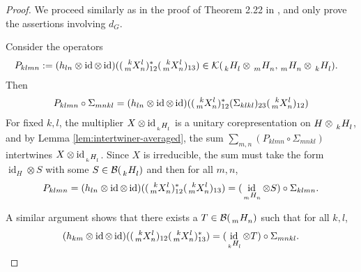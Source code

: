 \documentclass[11pt]{article}
\DeclareMathOperator{\id}{id}
\newcommand{\Gr}[5]{\,\tensor*[^{#2}_{#4}]{#1}{^{#3}_{#5}}}%
\newcommand{\Grd}[3]{\Gr{#1}{}{}{#2}{#3}}
\theoremstyle{definition}
\numberwithin{equation}{section}
\begin{document}
\begin{proof}
  We proceed similarly as in the proof of  Theorem 2.22 in \cite{}, and only prove the assertions
  involving $d_{G}$.

  Consider the operators
  \begin{align*}
    P_{klmn} &:= (h_{ln} \otimes \id \otimes
    \id)((\Gr{X}{k}{l}{m}{n})^{*}_{12}(\Gr{X}{k}{l}{m}{n})_{13})  \in
    \mathcal{K}(\Grd{H}{k}{l} \otimes \Grd{H}{m}{n}, \Grd{H}{m}{n}\otimes \Grd{H}{k}{l}).
  \end{align*}
  Then
  \begin{align*}
    P_{klmn} \circ \Sigma_{mnkl} = (h_{ln} \otimes \id \otimes \id)((\Gr{X}{k}{l}{m}{n})^{*}_{12}(\Sigma_{klkl})_{23}(\Gr{X}{k}{l}{m}{n})_{12})
  \end{align*}
  For fixed $k,l$, the multiplier $X \otimes \id_{\Grd{H}{k}{l}}$ is a unitary corepresentation on
  $H \otimes \Grd{H}{k}{l}$, and by Lemma \ref{lem:intertwiner-averaged}, the sum $\sum_{m,n}
  (P_{klmn}\circ \Sigma_{mnkl})$ intertwines $X \otimes \id_{\Grd{H}{k}{l}}$. Since $X$ is
  irreducible, the sum must take the form $\id_{H} \otimes S$ with some $S\in
  \mathcal{B}(\Grd{H}{k}{l})$ and then for all $m,n$,
  \begin{align} \label{eq:schur-aux-1}
    P_{klmn} = (h_{ln} \otimes \id \otimes
    \id)((\Gr{X}{k}{l}{m}{n})^{*}_{12}(\Gr{X}{k}{l}{m}{n})_{13})= (\id_{\Grd{H}{m}{n}} \otimes
    S) \circ \Sigma_{klmn}.
  \end{align}

  A similar argument shows that there exists a $T\in \mathcal{B}(\Grd{H}{m}{n})$ such that for all
  $k,l$,
\begin{align} \label{eq:schur-aux-2} 
  (h_{km} \otimes \id \otimes
  \id)((\Gr{X}{k}{l}{m}{n})_{12}(\Gr{X}{k}{l}{m}{n})^{*}_{13})= (\id_{\Grd{H}{k}{l}} \otimes T) \circ
  \Sigma_{mnkl}.
  \end{align}


\end{proof}
\end{document}
